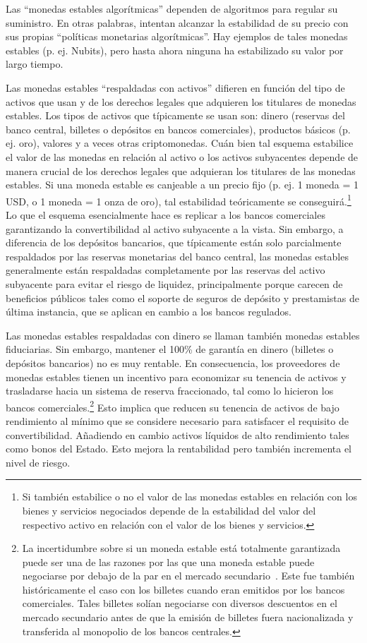 \documentclass[a4paper,10pt]{article} %
\begin{document}
Las ``monedas estables algorítmicas'' dependen de algoritmos para
regular su suministro. En otras palabras, intentan alcanzar la
estabilidad de su precio con sus propias ``políticas monetarias
algorítmicas''. Hay ejemplos de tales monedas estables (p. ej. Nubits),
pero hasta ahora ninguna ha estabilizado su valor por largo tiempo.

Las monedas estables ``respaldadas con activos'' difieren en función del
tipo de activos que usan y de los derechos legales que adquieren los
titulares de monedas estables. Los tipos de activos que típicamente se
usan son: dinero (reservas del banco central, billetes o depósitos en
bancos comerciales), productos básicos (p. ej. oro), valores y a veces
otras criptomonedas. Cuán bien tal esquema estabilice el valor de las
monedas en relación al activo o los activos subyacentes depende de
manera crucial de los derechos legales que adquieran los titulares de
las monedas estables. Si una moneda estable es canjeable a un precio
fijo (p. ej. 1 moneda = 1 USD, o 1 moneda = 1 onza de oro), tal
estabilidad teóricamente se conseguirá.\footnote{Si también estabilice o
no el valor de las monedas estables en relación con los bienes y
servicios negociados depende de la estabilidad del valor del respectivo
activo en relación con el valor de los bienes y servicios.} Lo que el esquema
esencialmente hace es replicar a los bancos comerciales garantizando la
convertibilidad al activo subyacente a la vista. Sin embargo, a
diferencia de los depósitos bancarios, que típicamente están solo
parcialmente respaldados por las reservas monetarias del banco central,
las monedas estables generalmente están respaldadas completamente por
las reservas del activo subyacente para evitar el riesgo de liquidez,
principalmente porque carecen de beneficios públicos tales como el
soporte de seguros de depósito y prestamistas de última instancia, que
se aplican en cambio a los bancos regulados.

Las monedas estables respaldadas con dinero se llaman también monedas
estables fiduciarias. Sin embargo, mantener el 100\% de garantía en
dinero (billetes o depósitos bancarios) no es muy rentable. En
consecuencia, los proveedores de monedas estables tienen un incentivo
para economizar su tenencia de activos y trasladarse hacia un sistema de
reserva fraccionado, tal como lo hicieron los bancos comerciales.\footnote
{La incertidumbre sobre si un moneda estable está
totalmente garantizada puede ser una de las razones por las que una
moneda estable puede negociarse por debajo de la par en el mercado
secundario~\cite[véase][]{Lyons}. Este fue
también históricamente el caso con los billetes cuando eran emitidos
por los bancos comerciales. Tales billetes solían negociarse con
diversos descuentos en el mercado secundario antes de que la emisión
de billetes fuera nacionalizada y transferida al monopolio de los
bancos centrales.} Esto implica que reducen su tenencia de activos de
bajo rendimiento al mínimo que se considere necesario para satisfacer el
requisito de convertibilidad. Añadiendo en cambio activos líquidos de
alto rendimiento tales como bonos del Estado. Esto mejora la
rentabilidad pero también incrementa el nivel de riesgo.
\end{document}
